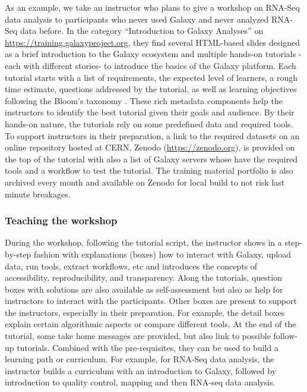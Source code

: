 \documentclass[10pt,letterpaper]{article}
\begin{document}
As an example, we take an instructor who plans to give a workshop on RNA-Seq data analysis to participants who never used Galaxy and never analyzed RNA-Seq data before.
In the category “Introduction to Galaxy Analyses” on \url{https://training.galaxyproject.org}, they find several HTML-based slides designed as a brief introduction to the Galaxy ecosystem and multiple hands-on tutorials -each with different stories- to introduce the basics of the Galaxy platform.
Each tutorial starts with a list of requirements, the expected level of learners, a rough time estimate, questions addressed by the tutorial, as well as learning objectives following the Bloom’s taxonomy \cite{TODO}.
These rich metadata components help the instructors to identify the best tutorial given their goals and audience.
By their hands-on nature, the tutorials rely on some predefined data and required tools.
To support instructors in their preparation, a link to the required datasets on an online repository hosted at CERN, Zenodo (\url{https://zenodo.org}), is provided on the top of the tutorial with also a list of Galaxy servers whose have the required tools and a workflow to test the tutorial.
The training material portfolio is also archived every month and available on Zenodo for local build to not risk last minute breakages.

\subsubsection*{Teaching the workshop}

During the workshop, following the tutorial script, the instructor shows in a step-by-step fashion with explanations (boxes) how to interact with Galaxy, upload data, run tools, extract workflows, etc and introduces the concepts of accessibility, reproducibility, and transparency. %
Along the tutorials, question boxes with solutions are also available as self-assessment but also as help for instructors to interact with the participants. Other boxes are present to support the instructors, especially in their preparation.
For example, the detail boxes explain certain algorithmic aspects or compare different tools.
At the end of the tutorial, some take home messages are provided, but also link to possible follow-up tutorials.
Combined with the pre-requisites, they can be used to build a learning path or curriculum.
For example, for RNA-Seq data analysis, the instructor builds a curriculum with an introduction to Galaxy, followed by introduction to quality control, mapping and then RNA-seq data analysis.
\end{document}
